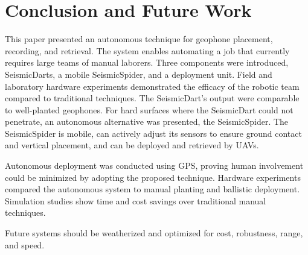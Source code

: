  \section{Conclusion and Future Work}\label{sec:Conclusion}
This paper presented an autonomous technique for geophone placement, recording, and retrieval. The system enables automating a job that currently requires large teams of manual laborers. Three components were introduced, SeismicDarts, a mobile SeismicSpider, and a deployment unit.
Field and laboratory hardware experiments demonstrated the efficacy of the robotic team compared to traditional techniques. 
The SeismicDart's output were comparable to well-planted geophones. 
For hard surfaces where the SeismicDart could not penetrate, an autonomous alternative was presented, the SeismicSpider.  
The SeismicSpider is mobile, can actively adjust its sensors to ensure ground contact and vertical placement, and can be deployed and retrieved by UAVs.

Autonomous deployment was conducted using GPS, proving human involvement could be minimized by adopting the proposed technique. 
Hardware experiments compared the autonomous system to manual planting and ballistic deployment.
Simulation studies show time and cost savings over traditional manual techniques.

Future systems should be weatherized and optimized for cost, robustness, range, and speed. 
